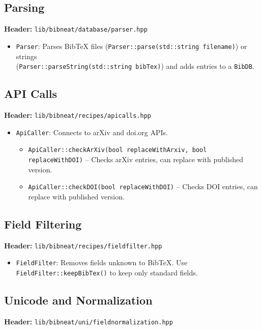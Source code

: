 \documentclass[11pt]{article}
\begin{document}
\subsection{Parsing}
\textbf{Header:} \texttt{lib/bibneat/database/parser.hpp}

\begin{itemize}
  \item \texttt{Parser}: Parses BibTeX files (\texttt{Parser::parse(std::string filename)}) or strings \\
(\texttt{Parser::parseString(std::string bibTex)}) and adds entries to a \texttt{BibDB}.
\end{itemize}

\subsection{API Calls}
\textbf{Header:} \texttt{lib/bibneat/recipes/apicalls.hpp}

\begin{itemize}
  \item \texttt{ApiCaller}: Connects to arXiv and doi.org APIs.
    \begin{itemize}
      \item \texttt{ApiCaller::checkArXiv(bool replaceWithArxiv, bool replaceWithDOI)} -- Checks arXiv entries, can replace with published version.
      \item \texttt{ApiCaller::checkDOI(bool replaceWithDOI)} -- Checks DOI entries, can replace with published version.
    \end{itemize}
\end{itemize}

\subsection{Field Filtering}
\textbf{Header:} \texttt{lib/bibneat/recipes/fieldfilter.hpp}

\begin{itemize}
  \item \texttt{FieldFilter}: Removes fields unknown to BibTeX. Use \texttt{FieldFilter::keepBibTex()} to keep only standard fields.
\end{itemize}

\subsection{Unicode and Normalization}
\textbf{Header:} \texttt{lib/bibneat/uni/fieldnormalization.hpp}
\end{document}

